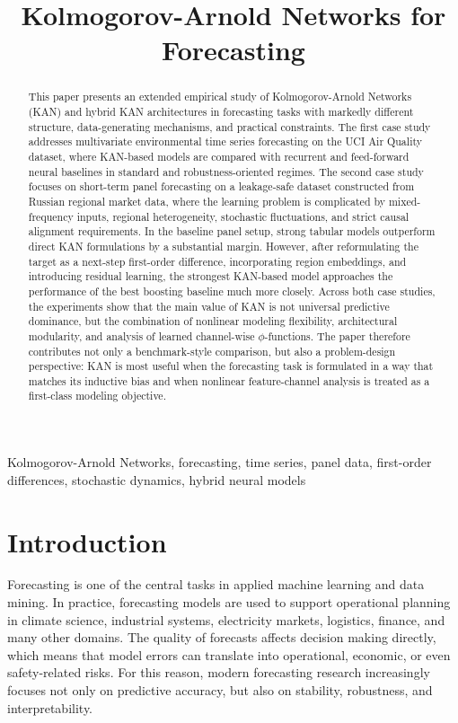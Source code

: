 \documentclass[10pt,conference,onecolumn]{IEEEtran}
\title{Kolmogorov-Arnold Networks for Forecasting}
\author{
\IEEEauthorblockN{Kirill Alekhin}
\IEEEauthorblockA{
ITMO University\\
Saint Petersburg, Russia\\
\texttt{ksalekhin@gmail.com}
}
}
\begin{document}
\maketitle

\begin{abstract}
This paper presents an extended empirical study of Kolmogorov-Arnold Networks (KAN) and hybrid KAN architectures in forecasting tasks with markedly different structure, data-generating mechanisms, and practical constraints. The first case study addresses multivariate environmental time series forecasting on the UCI Air Quality dataset, where KAN-based models are compared with recurrent and feed-forward neural baselines in standard and robustness-oriented regimes. The second case study focuses on short-term panel forecasting on a leakage-safe dataset constructed from Russian regional market data, where the learning problem is complicated by mixed-frequency inputs, regional heterogeneity, stochastic fluctuations, and strict causal alignment requirements. In the baseline panel setup, strong tabular models outperform direct KAN formulations by a substantial margin. However, after reformulating the target as a next-step first-order difference, incorporating region embeddings, and introducing residual learning, the strongest KAN-based model approaches the performance of the best boosting baseline much more closely. Across both case studies, the experiments show that the main value of KAN is not universal predictive dominance, but the combination of nonlinear modeling flexibility, architectural modularity, and analysis of learned channel-wise $\phi$-functions. The paper therefore contributes not only a benchmark-style comparison, but also a problem-design perspective: KAN is most useful when the forecasting task is formulated in a way that matches its inductive bias and when nonlinear feature-channel analysis is treated as a first-class modeling objective.
\end{abstract}

\begin{IEEEkeywords}
Kolmogorov-Arnold Networks, forecasting, time series, panel data, first-order differences, stochastic dynamics, hybrid neural models
\end{IEEEkeywords}

\section{Introduction}

Forecasting is one of the central tasks in applied machine learning and data mining. In practice, forecasting models are used to support operational planning in climate science, industrial systems, electricity markets, logistics, finance, and many other domains. The quality of forecasts affects decision making directly, which means that model errors can translate into operational, economic, or even safety-related risks. For this reason, modern forecasting research increasingly focuses not only on predictive accuracy, but also on stability, robustness, and interpretability.
\end{document}
